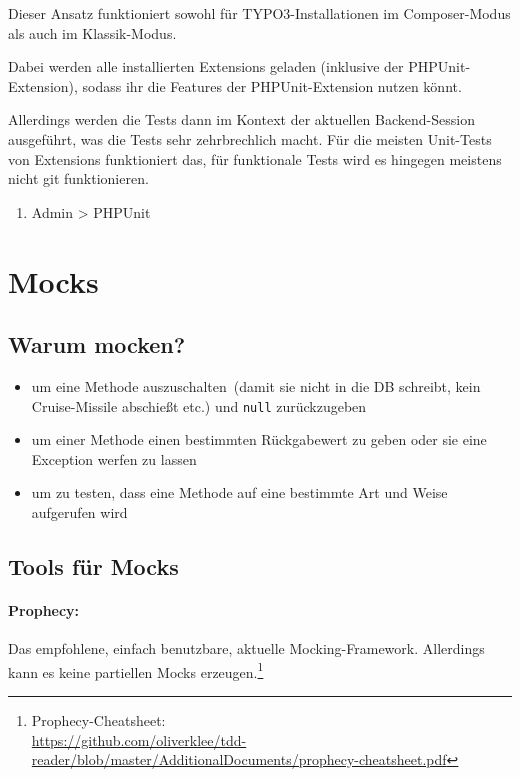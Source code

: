 \documentclass[a4paper,11pt,headsepline]{scrartcl}
\begin{document}
Dieser Ansatz funktioniert sowohl für TYPO3-Installationen im Composer-Modus als auch im Klassik-Modus.

Dabei werden alle installierten Extensions geladen (inklusive der PHPUnit-Extension), sodass ihr die Features der PHPUnit-Extension nutzen könnt.

Allerdings werden die Tests dann im Kontext der aktuellen Backend-Session ausgeführt, was die Tests sehr zehrbrechlich macht. Für die meisten Unit-Tests von Extensions funktioniert das, für funktionale Tests wird es hingegen meistens nicht git funktionieren.

\begin{enumerate}
  \item Admin > PHPUnit
\end{enumerate}



\pagebreak
\section{Mocks}

\subsection{Warum mocken?}
\begin{itemize}
  \item um eine Methode \glqq auszuschalten\grqq\ (damit sie nicht in die DB schreibt, kein Cruise-Missile abschießt etc.) und \texttt{null} zurückzugeben
  \item um einer Methode einen bestimmten Rückgabewert zu geben oder sie eine Exception werfen zu lassen
  \item um zu testen, dass eine Methode auf eine bestimmte Art und Weise aufgerufen wird
\end{itemize}

\subsection{Tools für Mocks}

\paragraph{Prophecy:} Das empfohlene, einfach benutzbare, aktuelle Mocking-Framework. Allerdings kann es keine partiellen Mocks erzeugen.\footnote{Prophecy-Cheatsheet:\\ \url{https://github.com/oliverklee/tdd-reader/blob/master/AdditionalDocuments/prophecy-cheatsheet.pdf}}
\end{document}
